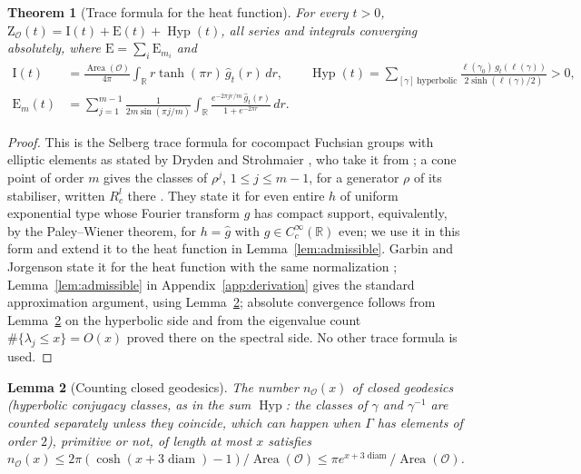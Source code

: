 \documentclass[pdflatex,sn-mathphys-num]{sn-jnl}
\theoremstyle{thmstyleone}%
\newtheorem{theorem}{Theorem}[section]%
\newtheorem{lemma}[theorem]{Lemma}%
\theoremstyle{thmstylethree}%
\newcommand{\Orb}{\mathcal{O}}
\newcommand{\Area}{\operatorname{Area}}
\newcommand{\Hyp}{\operatorname{Hyp}}
\newcommand{\diam}{\operatorname{diam}}
\newcommand{\R}{\mathbb{R}}
\newcommand{\cZ}{\mathrm{Z}}
\begin{document}
\begin{theorem}[Trace formula for the heat function]\label{thm:IEH}
For every $t>0$, $\cZ_\Orb(t)=\mathrm I(t)+\mathrm E(t)+\Hyp(t)$, all series and integrals converging absolutely, where $\mathrm E=\sum_i\mathrm E_{m_i}$ and
\begin{align*}
  \mathrm I(t)&=\frac{\Area(\Orb)}{4\pi}\int_\R r\tanh(\pi r)\,\hat g_t(r)\,dr,\qquad
  \Hyp(t)=\sum_{[\gamma]\ \mathrm{hyperbolic}}\frac{\ell(\gamma_0)\,g_t(\ell(\gamma))}{2\sinh(\ell(\gamma)/2)}>0,\\
  \mathrm E_m(t)&=\sum_{j=1}^{m-1}\frac1{2m\sin(\pi j/m)}\int_\R\frac{e^{-2\pi jr/m}\,\hat g_t(r)}{1+e^{-2\pi r}}\,dr .
\end{align*}
\end{theorem}

\begin{proof}
This is the Selberg trace formula for cocompact Fuchsian groups with elliptic elements as stated by Dryden and Strohmaier \cite[eq.~(1)]{drydenstrohmaier2009}, who take it from \cite{hejhal1976,iwaniec2002}; a cone point of order $m$ gives the classes of $\rho^j$, $1\le j\le m-1$, for a generator $\rho$ of its stabiliser, written $R_c^l$ there \cite[p.~68]{drydenstrohmaier2009}. They state it for even entire $h$ of uniform exponential type whose Fourier transform $g$ has compact support, equivalently, by the Paley--Wiener theorem, for $h=\hat g$ with $g\in C_c^\infty(\R)$ even; we use it in this form and extend it to the heat function in Lemma~\ref{lem:admissible}. Garbin and Jorgenson state it for the heat function with the same normalization \cite[Rem.~2.7, (2.8)]{garbinjorgenson2020}; Lemma~\ref{lem:admissible} in Appendix~\ref{app:derivation} gives the standard approximation argument, using Lemma~\ref{lem:counting}; absolute convergence follows from Lemma~\ref{lem:counting} on the hyperbolic side and from the eigenvalue count $\#\{\lambda_j\le x\}=O(x)$ proved there on the spectral side. No other trace formula is used.
\end{proof}

\begin{lemma}[Counting closed geodesics]\label{lem:counting}
The number $n_\Orb(x)$ of closed geodesics (hyperbolic conjugacy classes, as in the sum $\Hyp$: the classes of $\gamma$ and $\gamma^{-1}$ are counted separately unless they coincide, which can happen when $\Gamma$ has elements of order $2$), primitive or not, of length at most $x$ satisfies $n_\Orb(x)\le2\pi(\cosh(x+3\diam)-1)/\Area(\Orb)\le\pi e^{x+3\diam}/\Area(\Orb)$.
\end{lemma}
\end{document}
